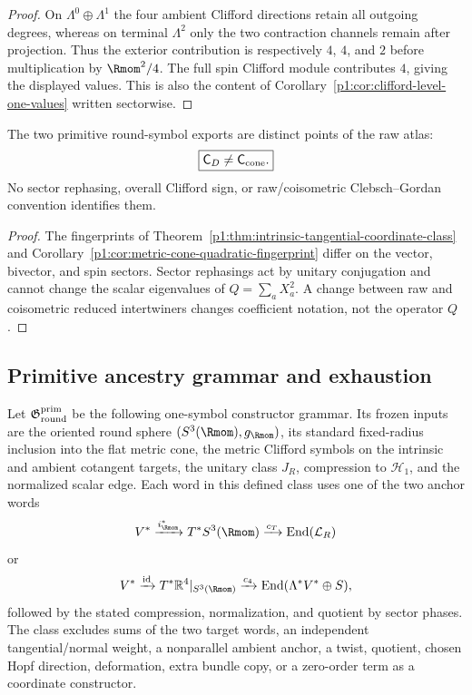 \documentclass[11pt]{article}
\begin{document}
\begin{proof}
On \(\Lambda^0\oplus\Lambda^1\) the four ambient Clifford directions retain
all outgoing degrees, whereas on terminal \(\Lambda^2\) only the two
contraction channels remain after projection.  Thus the exterior contribution
is respectively \(4\), \(4\), and \(2\) before multiplication by
\(\Rmom^2/4\).  The full spin Clifford module contributes \(4\), giving the
displayed values.  This is also the content of
Corollary~\ref{p1:cor:clifford-level-one-values} written sectorwise.
\end{proof}

\begin{corollary}
\label{p1:cor:cone-tangential-coordinate-inequivalence}
The two primitive round-symbol exports are distinct points of the raw atlas:
\[
 \boxed{\mathsf C_D\ne\mathsf C_{\rm cone}.}
\]
No sector rephasing, overall Clifford sign, or raw/coisometric
Clebsch--Gordan convention identifies them.
\end{corollary}

\begin{proof}
The fingerprints of
Theorem~\ref{p1:thm:intrinsic-tangential-coordinate-class} and
Corollary~\ref{p1:cor:metric-cone-quadratic-fingerprint} differ on the vector,
bivector, and spin sectors.  Sector rephasings act by unitary conjugation and
cannot change the scalar eigenvalues of \(Q=\sum_aX_a^2\).  A change between
raw and coisometric reduced intertwiners changes coefficient notation, not
the operator \(Q\).
\end{proof}

\subsection{Primitive ancestry grammar and exhaustion}

\begin{definition}
\label{p1:def:primitive-round-symbol-ancestry-grammar}
Let \(\mathfrak G_{\rm round}^{\rm prim}\) be the following one-symbol
constructor grammar.  Its frozen inputs are the oriented round sphere
\((S^3(\Rmom),g_{\Rmom})\), its standard fixed-radius inclusion into the flat
metric cone, the metric Clifford symbols on the intrinsic and ambient
cotangent targets, the unitary class \(J_R\), compression to \(\mathcal H_1\),
and the normalized scalar edge. Each word in this defined class uses one of
the two anchor
words
\[
 V^*\xrightarrow{i_{\Rmom}^*}T^*S^3(\Rmom)
 \xrightarrow{c_T}\operatorname{End}(\mathcal L_R)
\]
or
\[
 V^*\xrightarrow{\mathrm{id}}T^*\mathbb R^4|_{S^3(\Rmom)}
 \xrightarrow{c_4}\operatorname{End}(\Lambda^*V^*\oplus S),
\]
followed by the stated compression, normalization, and quotient by sector
phases. The class excludes sums of the two target words, an independent
tangential/normal weight, a nonparallel ambient anchor, a twist, quotient,
chosen Hopf direction, deformation, extra bundle copy, or a zero-order term
as a coordinate constructor.
\end{definition}
\end{document}
